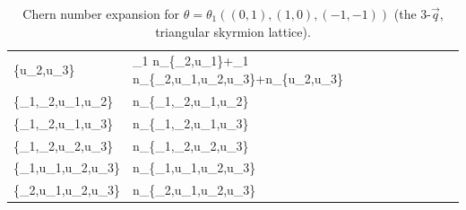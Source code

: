 \documentclass[
    10pt,
    aps,
    prb,
    twocolumn,
    floatfix,
    superscriptaddress,
]{revtex4-2}
\begin{document}
\begin{turnpage}
\begin{table}
\begin{tabular}{L|L}
		\left\{u_2,u_3\right\} & \theta _1 n_{\left\{\tau _2,u_1\right\}}+\theta _1
		n_{\left\{\tau _2,u_1,u_2,u_3\right\}}+n_{\left\{u_2,u_3\right\}} \\
		\left\{\tau _1,\tau _2,u_1,u_2\right\} & n_{\left\{\tau _1,\tau _2,u_1,u_2\right\}} \\
		\left\{\tau _1,\tau _2,u_1,u_3\right\} & n_{\left\{\tau _1,\tau _2,u_1,u_3\right\}} \\
		\left\{\tau _1,\tau _2,u_2,u_3\right\} & n_{\left\{\tau _1,\tau _2,u_2,u_3\right\}} \\
		\left\{\tau _1,u_1,u_2,u_3\right\} & n_{\left\{\tau _1,u_1,u_2,u_3\right\}} \\
		\left\{\tau _2,u_1,u_2,u_3\right\} & n_{\left\{\tau _2,u_1,u_2,u_3\right\}}
	\end{tabular}
	\caption{Chern number expansion for $ \theta = \theta_1 (( 
		0, 1),
		(  1,0 ),
		( -1,-1 )) $ (the 3-$\vec{q}$, triangular skyrmion lattice).}
	\label{tab:3q_2d}
	\end{table}
\end{turnpage}
\end{document}
